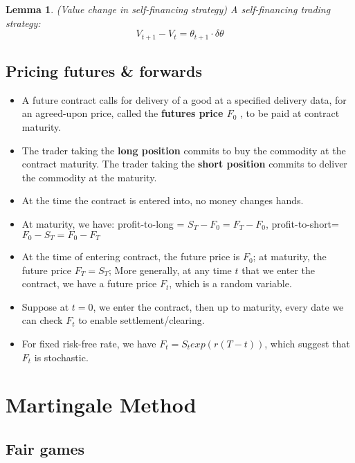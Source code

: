 \documentclass[a4paper,13pt]{report}
\newtheorem{lemma}[theorem]{Lemma}
\begin{document}
\begin{lemma}
(Value change in self-financing strategy) A self-financing trading strategy:
$$V_{t+1}-V_t = \theta_{t+1}\cdot \delta \theta$$
\end{lemma}



\section{Pricing futures \& forwards}
\begin{itemize}
    \item A future contract calls for delivery of a good at a specified delivery data, for an agreed-upon price, called the \textbf{futures price $F_0$} , to be paid at contract maturity.
    \item The trader taking the \textbf{long position} commits to buy the commodity at the contract maturity. The trader taking the \textbf{short position} commits to deliver the commodity at the maturity. 
    \item At the time the contract is entered into, no money changes hands. 
    \item At maturity, we have: profit-to-long = $S_T - F_0 = F_T - F_0$, profit-to-short=$F_0 - S_T = F_0 - F_T$
    \item At the time of entering contract, the future price is $F_0$; at maturity, the future price $F_T = S_T$; More generally, at any time $t$ that we enter the contract, we have a future price $F_t$, which is a random variable. 
    \item Suppose at $t=0$, we enter the contract, then up to maturity, every date we can check $F_t$ to enable settlement/clearing. 
    \item For fixed risk-free rate, we have $F_t = S_t exp(r(T-t))$, which suggest that $F_t$ is stochastic. 
\end{itemize} 



\chapter{Martingale Method}
\section{Fair games}
\end{document}
